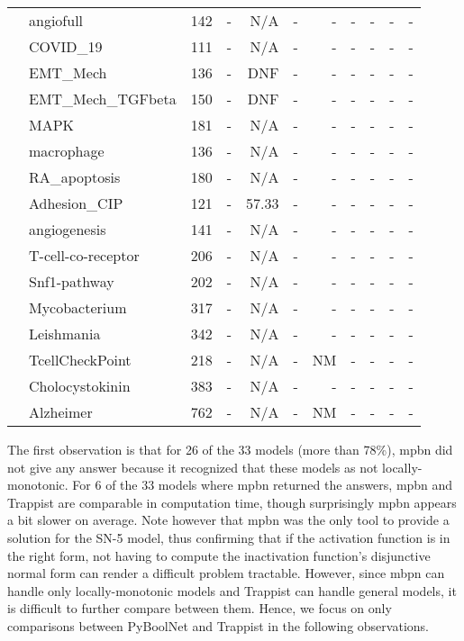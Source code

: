 \documentclass[preprint,12pt]{elsarticle}
\newcounter{rownumber}
\newcommand\rownb{\stepcounter{rownumber}\arabic{rownumber}}
\begin{document}
\begin{table}[!htb]
\begin{tabular}{rlrrrrrrrrr}
    \midrule %
    \rownb & angiofull & 142 & - & N/A & - & - & - & - & - & - \\
    \rownb & COVID\_19 & 111 & - & N/A & - & - & - & - & - & - \\
    \rownb & EMT\_Mech & 136 & - & DNF & - & - & - & - & - & - \\
    \rownb & EMT\_Mech\_TGFbeta & 150 & - & DNF & - & - & - & - & - & - \\
    \rownb & MAPK & 181 & - & N/A & - & - & - & - & - & - \\
    \rownb & macrophage & 136 & - & N/A & - & - & - & - & - & - \\
    \rownb & RA\_apoptosis & 180 & - & N/A & - & - & - & - & - & - \\
    \rownb & Adhesion\_CIP & 121 & - & 57.33 & - & - & - & - & - & - \\
    \rownb & angiogenesis & 141 & - & N/A & - & - & - & - & - & - \\
    
    \midrule %
    \rownb & T-cell-co-receptor & 206 & - & N/A & - & - & - & - & - & - \\
    \rownb & Snf1-pathway & 202 & - & N/A & - & - & - & - & - & - \\
    \rownb & Mycobacterium & 317 & - & N/A & - & - & - & - & - & - \\
    \rownb & Leishmania & 342 & - & N/A & - & - & - & - & - & - \\
    \rownb & TcellCheckPoint & 218 & - & N/A & - & NM & - & - & - & - \\
    \rownb & Cholocystokinin & 383 & - & N/A & - & - & - & - & - & - \\
    \rownb & Alzheimer & 762 & - & N/A & - & NM & - & - & - & - \\
    
    \bottomrule
  \end{tabular}
\end{table}

The first observation is that for 26 of the 33 models (more than 78\%), mpbn did not give any answer because it recognized that these models as not locally-monotonic.
For 6 of the 33 models where mpbn returned the answers, mpbn and Trappist are comparable in computation time, though surprisingly mpbn appears a bit slower on average.
Note however that mpbn was the only tool to provide a solution for the SN-5 model, thus confirming that if the activation function is in the right form, not having to compute the inactivation function's disjunctive normal form can render a difficult problem tractable.
However, since mbpn can handle only locally-monotonic models and Trappist can handle general models, it is difficult to further compare between them.
Hence, we focus on only comparisons between PyBoolNet and Trappist in the following observations.
\end{document}
